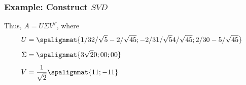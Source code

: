 \begin{frame}\frametitle{Example: Construct $SVD$}  

    Thus, $A = U\Sigma V^T$, where
    \begin{align*}
        U &= \spalignmat{1/3 2/\sqrt5 -2/\sqrt{45};-2/3 1/\sqrt5 4/\sqrt{45}; 2/3 0 -5/\sqrt{45}}\\[4pt]
    \Sigma &= \spalignmat{3\sqrt2 0;0 0;0 0} \\[4pt]
    V &= \frac{1}{\sqrt2}\spalignmat{1 1;-1 1} 
    \end{align*} 
    
    
\end{frame}







